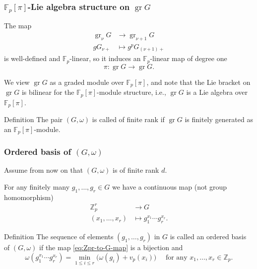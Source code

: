 \documentclass{beamer}
\newcommand*\Z{\mathbb{Z}}
\newcommand*\F{\mathbb{F}}
\DeclareMathOperator{\gr}{gr} %
\begin{document}
\begin{frame}
  \frametitle{$\F_{p}[\pi]$-Lie algebra structure on $\gr G$}

  The map
  \begin{align*}
    \gr_{\nu} G &\to \gr_{\nu+1} G \\
    gG_{\nu+} &\mapsto g^{p}G_{(\nu+1)+}
  \end{align*}
  is well-defined and $\F_{p}$-linear, so it induces an $\F_{p}$-linear map of degree one \[ \pi \colon \gr G \to \gr G. \]

  We view $\gr G$ as a graded module over $\F_{p}[\pi]$, and note that the Lie bracket on $\gr G$ is bilinear for the $\F_{p}[\pi]$-module structure, i.e., $\gr G$ is a Lie algebra over $\F_{p}[\pi]$.

  \pause
  \begin{block}{Definition}
    The pair $(G,\omega)$ is called of finite rank if $\gr G$ is finitely generated as an $\F_{p}[\pi]$-module.
  \end{block}
\end{frame}

\begin{frame}
  \frametitle{Ordered basis of $(G,\omega)$}
  
  Assume from now on that $(G,\omega)$ is of finite rank $d$.

  For any finitely many $g_{1},\dotsc,g_{r} \in G$ we have a continuous map (not group homomorphism)
  \begin{equation}
    \label{eq:Zpr-to-G-map}
    \begin{aligned}
      \Z_{p}^{r} &\to G \\
      (x_{1},\dotsc,x_{r}) &\mapsto g_{1}^{x_{1}} \dotsb g_{r}^{x_{r}}.
    \end{aligned}
  \end{equation}

  \begin{block}{Definition}
    The sequence of elements $(g_{1},\dotsc,g_{r})$ in $G$ is called an ordered basis of $(G,\omega)$ if the map \eqref{eq:Zpr-to-G-map} is a bijection and \[ \omega(g_{1}^{x_{1}} \dotsb g_{r}^{x_{r}}) = \min_{1 \leq i \leq r} \bigl( \omega(g_{i})+v_{p}(x_{i}) \bigr) \quad \text{ for any }x_{1},\dotsc,x_{r} \in \Z_{p}. \]
  \end{block}
\end{frame}
\end{document}
